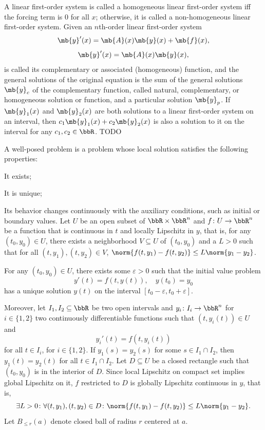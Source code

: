 \documentclass[a4paper,12pt]{report}
\begin{document}
A linear first-order system is called a homogeneous linear first-order system iff the forcing term is 0 for all $x$; otherwise, it is called a non-homogeneous linear first-order system.
Given an $n$th-order linear first-order system 
\[\mb{y}'(x)=\mb{A}(x)\mb{y}(x)+\mb{f}(x),\]
\[\mb{y}'(x)=\mb{A}(x)\mb{y}(x),\]
is called its complementary or associated (homogeneous) function, and the general solutions of the original equation is the sum of the general solutions $\mb{y}_c$ of the complementary function, called natural, complementary, or homogeneous solution or function, and a particular solution $\mb{y}_p$.
If $\mb{y}_1(x)$ and $\mb{y}_2(x)$ are both solutions to a linear first-order system on an interval, then $c_1\mb{y}_1(x)+c_2\mb{y}_2(x)$ is also a solution to it on the interval for any $c_1,c_2\in\bbR$.
TODO







A well-posed problem is a problem whose local solution satisfies the following properties:
\bit
\item It exists;
\item It is unique;
\item Its behavior changes continuously with the auxiliary conditions, such as initial or boundary values.
\eit
{}
Let $U$ be an open subset of $\bbR\times\bbR^n$ and $f\colon U\to\bbR^n$ be a function that is continuous in $t$ and locally Lipschitz in $y$, that is, for any $(t_0,y_0)\in U$, there exists a neighborhood $V\subseteq U$ of $(t_0,y_0)$ and a $L>0$ such that for all $(t,y_1),(t,y_2)\in V$, $\norm{f(t,y_1)-f(t,y_2)}\le L\norm{y_1-y_2}$.

For any $(t_0,y_0)\in U$, there exists some $\varepsilon>0$ such that the initial value problem
\[y'(t)=f(t,y(t)),\quad y(t_0)=y_0\]
has a unique solution $y(t)$ on the interval $[t_0-\varepsilon,t_0+\varepsilon]$.

Moreover, let $I_1,I_2\subseteq\bbR$ be two open intervals and $y_i\colon I_i\to\bbR^n$ for $i\in\{1,2\}$ two continuously differentiable functions such that $(t,y_i(t))\in U$ and
\[y_i'(t)=f(t,y_i(t))\]
for all $t\in I_i$, for $i\in\{1,2\}$. If $y_1(s)=y_2(s)$ for some $s\in I_1\cap I_2$, then $y_1(t)=y_2(t)$ for all $t\in I_1\cap I_2$.
\bpr
Let $D\subseteq U$ be a closed rectangle such that $(t_0,y_0)$ is in the interior of $D$. Since local Lipschitz on compact set implies global Lipschitz on it, $f$ restricted to $D$ is globally Lipschitz continuous in $y$, that is,
\[\exists L>0\colon\forall (t,y_1),(t,y_2)\in D\colon\norm{f(t,y_1)-f(t,y_2)}\le L\norm{y_1-y_2}.\]
Let $B_{\leq r}(a)$ denote closed ball of radius $r$ centered at $a$.
\end{document}
